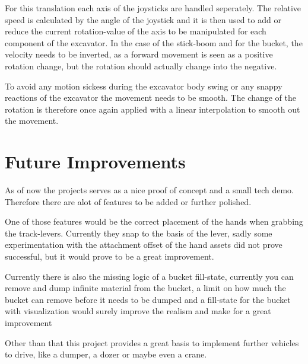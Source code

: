 \documentclass[journal]{vgtc}                     %
\begin{document}
For this translation each axis of the joysticks are handled seperately. The relative speed is calculated by the angle of the joystick and it is then used to add or reduce the current rotation-value of the axis to be manipulated for each component of the excavator. In the case of the stick-boom and for the bucket, the velocity needs to be inverted, as a forward movement is seen as a positive rotation change, but the rotation should actually change into the negative.

To avoid any motion sickess during the excavator body swing or any snappy reactions of the excavator the movement needs to be smooth. The change of the rotation is therefore once again applied with a linear interpolation to smooth out the movement.

\section{Future Improvements}

As of now the projects serves as a nice proof of concept and a small tech demo. Therefore there are alot of features to be added or further polished.

One of those features would be the correct placement of the hands when grabbing the track-levers. Currently they snap to the basis of the lever, sadly some experimentation with the attachment offset of the hand assets did not prove successful, but it would prove to be a great improvement.

Currently there is also the missing logic of a bucket fill-state, currently you can remove and dump infinite material from the bucket, a limit on how much the bucket can remove before it needs to be dumped and a fill-state for the bucket with visualization would surely improve the realism and make for a great improvement

Other than that this project provides a great basis to implement further vehicles to drive, like a dumper, a dozer or maybe even a crane.




%
%
%


\end{document}
